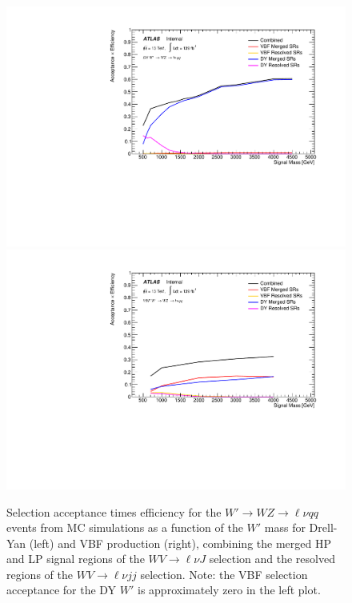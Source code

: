 \begin{figure}[h!]
  \centering
\includegraphics[width=0.48\hsize]{figures/Analysis/signal_acceptance/Acc_times_Eff1lepDYHVT.pdf}
    \includegraphics[width=0.48\hsize]{figures/Analysis/signal_acceptance/Acc_times_Eff1lepVBFHVT.pdf}

      \caption{Selection acceptance times efficiency for the $W'\to WZ\to \ell \nu qq$ events from MC simulations as a function of the $W'$ mass for Drell-Yan (left) and VBF production (right), combining the merged HP and LP signal regions of the $WV\to \ell\nu J$ selection and the resolved regions of the $WV\to \ell\nu jj$ selection. Note: the VBF selection acceptance for the DY $W'$ is approximately zero in the left plot.} 
  \label{fig:accept_hvtww}
\end{figure} 
\FloatBarrier


